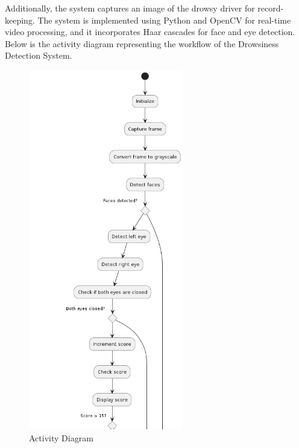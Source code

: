 \documentclass[12pt]{article}
\begin{document}
Additionally, the system captures an image of the drowsy driver for record-keeping. The system is implemented using Python and OpenCV for real-time video processing, and it incorporates Haar cascades for face and eye detection. Below is the activity diagram representing the workflow of the Drowsiness Detection System.
\begin{figure}[h]
\caption{Activity Diagram }
\centering
\includegraphics[width=0.6\textwidth]{act1}
\end{figure}
\FloatBarrier
\end{document}
